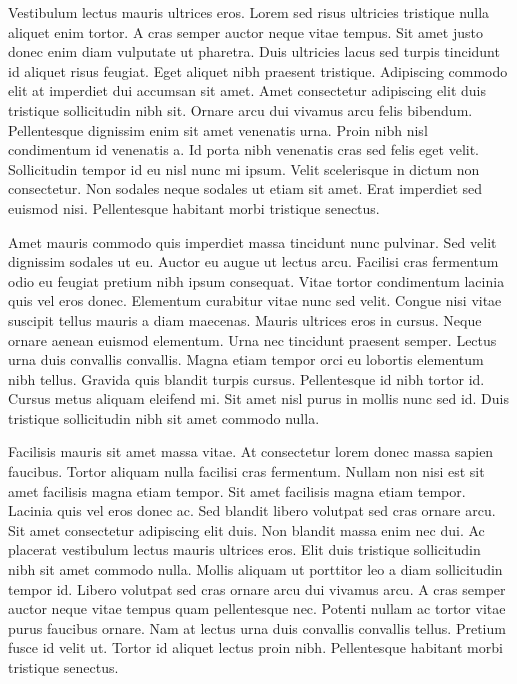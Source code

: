 \documentclass[11pt,a4paper]{article}
\begin{document}
Vestibulum lectus mauris ultrices eros. Lorem sed risus ultricies tristique nulla aliquet enim tortor. A cras semper auctor neque vitae tempus. Sit amet justo donec enim diam vulputate ut pharetra. Duis ultricies lacus sed turpis tincidunt id aliquet risus feugiat. Eget aliquet nibh praesent tristique. Adipiscing commodo elit at imperdiet dui accumsan sit amet. Amet consectetur adipiscing elit duis tristique sollicitudin nibh sit. Ornare arcu dui vivamus arcu felis bibendum. Pellentesque dignissim enim sit amet venenatis urna. Proin nibh nisl condimentum id venenatis a. Id porta nibh venenatis cras sed felis eget velit. Sollicitudin tempor id eu nisl nunc mi ipsum. Velit scelerisque in dictum non consectetur. Non sodales neque sodales ut etiam sit amet. Erat imperdiet sed euismod nisi. Pellentesque habitant morbi tristique senectus.

Amet mauris commodo quis imperdiet massa tincidunt nunc pulvinar. Sed velit dignissim sodales ut eu. Auctor eu augue ut lectus arcu. Facilisi cras fermentum odio eu feugiat pretium nibh ipsum consequat. Vitae tortor condimentum lacinia quis vel eros donec. Elementum curabitur vitae nunc sed velit. Congue nisi vitae suscipit tellus mauris a diam maecenas. Mauris ultrices eros in cursus. Neque ornare aenean euismod elementum. Urna nec tincidunt praesent semper. Lectus urna duis convallis convallis. Magna etiam tempor orci eu lobortis elementum nibh tellus. Gravida quis blandit turpis cursus. Pellentesque id nibh tortor id. Cursus metus aliquam eleifend mi. Sit amet nisl purus in mollis nunc sed id. Duis tristique sollicitudin nibh sit amet commodo nulla.

Facilisis mauris sit amet massa vitae. At consectetur lorem donec massa sapien faucibus. Tortor aliquam nulla facilisi cras fermentum. Nullam non nisi est sit amet facilisis magna etiam tempor. Sit amet facilisis magna etiam tempor. Lacinia quis vel eros donec ac. Sed blandit libero volutpat sed cras ornare arcu. Sit amet consectetur adipiscing elit duis. Non blandit massa enim nec dui. Ac placerat vestibulum lectus mauris ultrices eros. Elit duis tristique sollicitudin nibh sit amet commodo nulla. Mollis aliquam ut porttitor leo a diam sollicitudin tempor id. Libero volutpat sed cras ornare arcu dui vivamus arcu. A cras semper auctor neque vitae tempus quam pellentesque nec. Potenti nullam ac tortor vitae purus faucibus ornare. Nam at lectus urna duis convallis convallis tellus. Pretium fusce id velit ut. Tortor id aliquet lectus proin nibh. Pellentesque habitant morbi tristique senectus.
\end{document}
